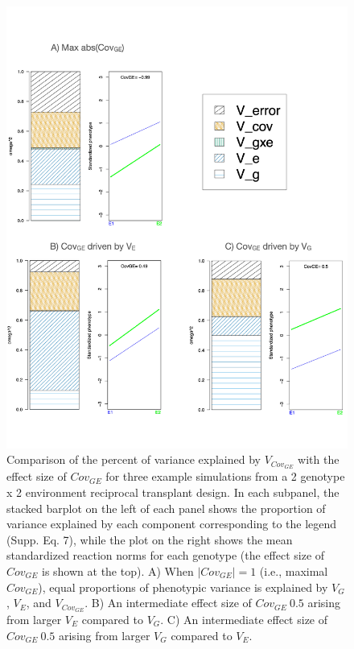 \documentclass[11pt, oneside]{amsart}
\begin{document}
\renewcommand\thefigure{S4}
\begin{figure}[h]
\begin{center}
\includegraphics[width=6in]{Figs/EstimateVsVariance.pdf}
\end{center}
\label{Fig: }
\caption[Comparison of the percent of variance explained by $V_{Cov_{GE}}$ with the effect size $Cov_{GE}$ for three example simulations from a 2 genotype x 2 environment reciprocal transplant design.]{Comparison of the percent of variance explained by $V_{Cov_{GE}}$ with the effect size of $Cov_{GE}$ for three example simulations from a 2 genotype x 2 environment reciprocal transplant design. In each subpanel, the stacked barplot on the left of each panel shows the proportion of variance explained by each component corresponding to the legend (Supp. Eq. 7), while the plot on the right shows the mean standardized reaction norms for each genotype (the effect size of $Cov_{GE}$ is shown at the top). A) When $| Cov_{GE} | = 1$ (i.e., maximal $Cov_{GE}$), equal proportions of phenotypic variance is explained by $V_G$, $V_E$, and $V_{Cov_{GE}}$. B) An intermediate effect size of  $Cov_{GE}~0.5$ arising from larger $V_E$ compared to $V_G$.  C) An intermediate effect size of  $Cov_{GE}~0.5$ arising from larger $V_G$ compared to $V_E$.  }
\end{figure}
\end{document}
